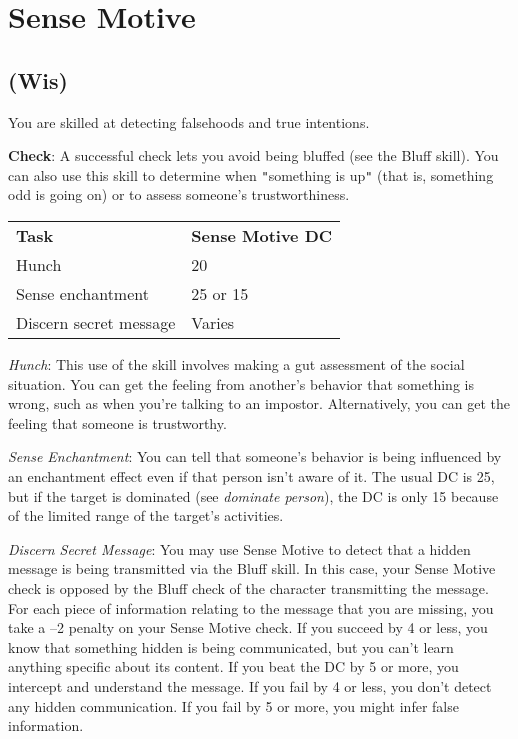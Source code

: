 \section{Sense Motive}

\label{f0}
\subsection{(Wis)}

				
You are skilled at detecting falsehoods and true intentions.
				
\textbf{Check}: A successful check lets you avoid being bluffed (see the Bluff skill). You can also use this skill to determine when \texttt{{}"{}}something is up\texttt{{}"{}} (that is, something odd is going on) or to assess someone's trustworthiness. 

\begin{table}
 \sffamily
 \begin{tabular}{ll}
\textbf{Task} & \textbf{Sense Motive DC}\\
Hunch & 20\\
Sense enchantment & 25 or 15\\
Discern secret message & Varies\\  
 \end{tabular}

\end{table}

				
\textit{Hunch}: This use of the skill involves making a gut assessment of the social situation. You can get the feeling from another's behavior that something is wrong, such as when you're talking to an impostor. Alternatively, you can get the feeling that someone is trustworthy.
				
\textit{Sense Enchantment}: You can tell that someone's behavior is being influenced by an enchantment effect even if that person isn't aware of it. The usual DC is 25, but if the target is dominated (see \textit{dominate person}), the DC is only 15 because of the limited range of the target's activities.
				
\textit{Discern Secret Message}: You may use Sense Motive to detect that a hidden message is being transmitted via the Bluff skill. In this case, your Sense Motive check is opposed by the Bluff check of the character transmitting the message. For each piece of information relating to the message that you are missing, you take a --2 penalty on your Sense Motive check. If you succeed by 4 or less, you know that something hidden is being communicated, but you can't learn anything specific about its content. If you beat the DC by 5 or more, you intercept and understand the message. If you fail by 4 or less, you don't detect any hidden communication. If you fail by 5 or more, you might infer false information.
				
